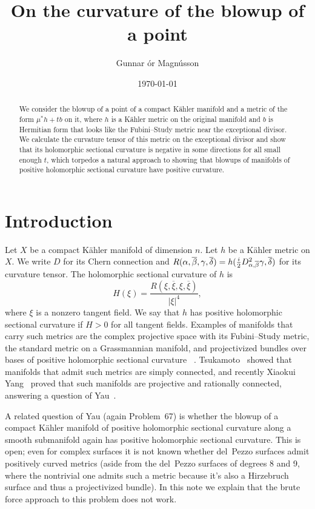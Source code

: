 \documentclass[10pt,a4paper]{amsart}
\author{Gunnar \TH\'or Magn\'usson}
\date{\today}
\title{On the curvature of the blowup of a point}
\def\ov#1{\overline{#1}}
\def\hsc{holomorphic sectional curvature}
\begin{document}
\begin{abstract}
We consider the blowup of a point of a compact K\"ahler manifold and a metric
of the form $\mu^*h + t b$ on it, where $h$ is a K\"ahler metric on the
original manifold and $b$ is Hermitian form that looks like the
Fubini--Study metric near the exceptional divisor.
We calculate the curvature tensor of this metric on the exceptional divisor
and show that its holomorphic sectional curvature is negative in some
directions for all small enough $t$, which torpedos a natural approach to
showing that blowups of manifolds of positive holomorphic sectional curvature
have positive curvature.
\end{abstract}

\maketitle


\section*{Introduction}

Let $X$ be a compact K\"ahler manifold of dimension $n$.
Let $h$ be a K\"ahler metric on $X$.
We write $D$ for its Chern connection and
$R(\alpha,\ov\beta,\gamma,\ov\delta) = h(\frac i2
D^2_{\smash{\alpha,\ov\beta}}\gamma, \ov\delta)$ for its curvature tensor. The
holomorphic sectional curvature of $h$ is
$$
H(\xi)
= \frac{R(\xi, \ov\xi, \xi, \ov\xi)}{|\xi|^4},
$$
where $\xi$ is a nonzero tangent field.
We say that $h$ has positive holomorphic sectional curvature if $H > 0$ for all
tangent fields.
Examples of manifolds that carry such metrics are the complex projective space
with its Fubini--Study metric, the standard metric on a Grassmannian manifold,
and projectivized bundles over bases of positive holomorphic sectional curvature
~\cite{alvarez2018projectivized}.
Tsukamoto~\cite{tsukamoto1957kahlerian} showed that manifolds that admit such
metrics are simply connected, and recently Xiaokui Yang~\cite{yang2017rc}
proved that such manifolds are projective and rationally connected, answering a
question of Yau~\cite[Problem~67]{yau1993open}.

A related question of Yau (again Problem~67) is whether the blowup of a compact
K\"ahler manifold of positive \hsc{} along a smooth submanifold again has
positive \hsc.
This is open; even for complex surfaces it is not known whether del~Pezzo
surfaces admit positively curved metrics (aside from the del~Pezzo surfaces of
degrees 8 and 9, where the nontrivial one admits such a metric because it's
also a Hirzebruch surface and thus a projectivized bundle). In this note we
explain that the brute force approach to this problem does not work.
\end{document}
